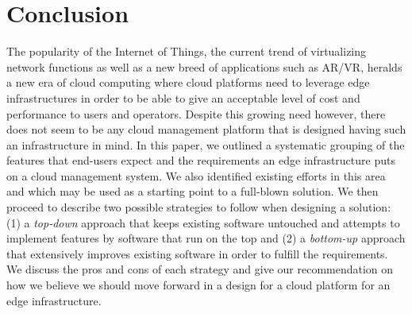 
\section{Conclusion}
\label{sec:conclusion}

The popularity of the Internet of Things, the current trend of virtualizing network functions as well as a new breed of applications such as AR/VR, heralds a new era of cloud computing where cloud platforms need to leverage edge infrastructures in order to be able to give an acceptable level of cost and performance to users and operators.  Despite this growing need however, there does not seem to be any cloud management platform that is designed having such an infrastructure in mind. In this paper, we outlined a systematic grouping of the features that end-users expect and the requirements an edge infrastructure puts on a cloud management system. We also identified existing efforts in this area and which may be used as a starting point to a full-blown solution. We then proceed to describe two possible strategies to follow when designing a solution: (1) a \emph{top-down} approach that keeps existing software untouched and attempts to implement features by software that run on the top and (2) a \emph{bottom-up} approach that extensively improves existing software in order to fulfill the requirements. We discuss the pros and cons of each strategy and  give our recommendation on how we believe we should move forward in a design for a cloud platform for an edge infrastructure.